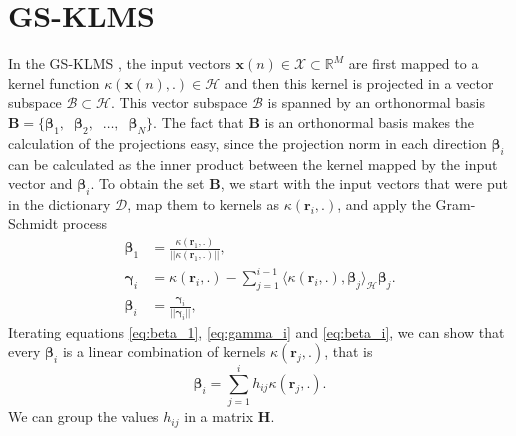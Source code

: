 \section{GS-KLMS}\label{sec:gsklms}

In the GS-KLMS \cite{bueno_gram-schmidt-based_2020}, the input vectors $\mathbf{x}(n) \in \mathcal{X} \subset \mathbb{R}^M$ are first mapped to a kernel function 
$\kappa(\mathbf{x}(n),.) \in \mathcal{H}$ and then this kernel is projected in a vector subspace $\mathcal{B}\subset \mathcal{H}$. This vector subspace 
$\mathcal{B}$ is spanned by an orthonormal basis $\mathbf{B} = \{\boldsymbol{\beta}_1, \;\; \boldsymbol{\beta}_2, \;\; \dots, \;\; \boldsymbol{\beta}_N\}$. The fact that 
$\mathbf{B}$ is an orthonormal basis makes the calculation of the projections easy, since the projection norm in each direction $\boldsymbol{\beta}_i$ can be calculated 
as the inner product between the kernel mapped by the input vector and $\boldsymbol{\beta}_i$. To obtain the set $\mathbf{B}$, we start with the input vectors that 
were put in the dictionary $\mathcal{D}$, map them to kernels as $\kappa(\mathbf{r}_i,.)$, and apply the Gram-Schmidt process \cite{meyer_matrix_2023}
\begin{align}
    \boldsymbol{\beta}_1 &= \frac{\kappa(\mathbf{r}_1,.)}{||\kappa(\mathbf{r}_1,.)||},\label{eq:beta_1}\\
    \boldsymbol{\gamma}_i &= \kappa(\mathbf{r}_i,.) - \sum_{j=1}^{i-1}\langle\kappa(\mathbf{r}_i,.),\boldsymbol{\beta}_j\rangle_{\mathcal{H}}\boldsymbol{\beta}_j.\label{eq:gamma_i}\\
    \boldsymbol{\beta}_i &= \frac{\boldsymbol{\gamma}_i}{||\boldsymbol{\gamma}_i||}, \label{eq:beta_i}
\end{align}
Iterating equations \eqref{eq:beta_1}, \eqref{eq:gamma_i} and \eqref{eq:beta_i}, we can show that every $\boldsymbol{\beta}_i$ is a linear combination of kernels $\kappa(\mathbf{r}_j,.)$, that is
\begin{equation}
    \boldsymbol{\beta}_i = \sum_{j=1}^{i} h_{ij}\kappa(\mathbf{r}_j,.).
\end{equation}
We can group the values $h_{ij}$ in a matrix $\mathbf{H}$.

